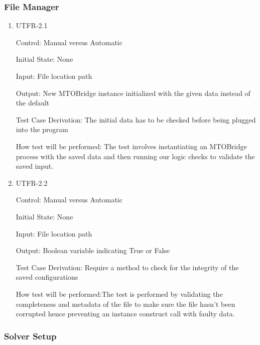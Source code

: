 \documentclass[12pt, titlepage]{article}
\begin{document}
\subsubsection{File Manager}

\begin{enumerate}

\item{UTFR-2.1\\}

Control: Manual versus Automatic
					
Initial State: None
					
Input: File location path
					
Output: New MTOBridge instance initialized with the given data instead of the default 

Test Case Derivation: The initial data has to be checked before being plugged into the program 
					
How test will be performed: The test involves instantiating an MTOBridge process with the saved data and then running our logic checks to validate the saved input.
					
\item{UTFR-2.2\\}

Control: Manual versus Automatic
					
Initial State: None
					
Input: File location path 
					
Output: Boolean variable indicating True or False 

Test Case Derivation: Require a method to check for the integrity of the saved configurations

How test will be performed:The test is performed by validating the completeness and metadata of the file to make sure the file hasn't been corrupted hence preventing an instance construct call with faulty data.

\end{enumerate}

\subsubsection{Solver Setup}
\end{document}
